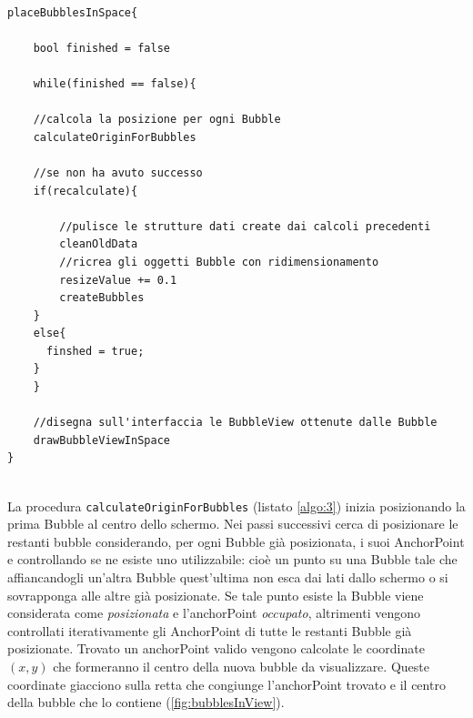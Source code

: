 \begin{lstlisting}[label=algo:2,caption=placeBubblesInSpace,breaklines=true]

placeBubblesInSpace{
    
    bool finished = false
    
    while(finished == false){
    
	//calcola la posizione per ogni Bubble
	calculateOriginForBubbles
	
	//se non ha avuto successo
	if(recalculate){
	
	    //pulisce le strutture dati create dai calcoli precedenti
	    cleanOldData 
	    //ricrea gli oggetti Bubble con ridimensionamento
	    resizeValue += 0.1
	    createBubbles 
	}
	else{
	  finshed = true;
	}
    }
    
    //disegna sull'interfaccia le BubbleView ottenute dalle Bubble
    drawBubbleViewInSpace
}


\end{lstlisting}


La procedura \texttt{calculateOriginForBubbles} (listato \ref{algo:3}) inizia posizionando la prima Bubble al centro dello schermo. Nei passi successivi cerca di posizionare le restanti bubble considerando, per ogni Bubble già posizionata, i suoi AnchorPoint e controllando se ne esiste uno utilizzabile: cioè un punto su una Bubble tale che affiancandogli un'altra Bubble quest'ultima non esca dai lati dallo schermo o si sovrapponga alle altre già posizionate. Se tale punto esiste la Bubble viene considerata come \emph{posizionata} e l'anchorPoint \emph{occupato}, altrimenti vengono controllati iterativamente gli AnchorPoint di tutte le restanti Bubble già posizionate. Trovato un anchorPoint valido vengono calcolate le coordinate $(x,y)$ che formeranno il centro della nuova bubble da visualizzare. Queste coordinate giacciono sulla retta che congiunge l'anchorPoint trovato e il centro della bubble che lo contiene (\ref{fig:bubblesInView}).

